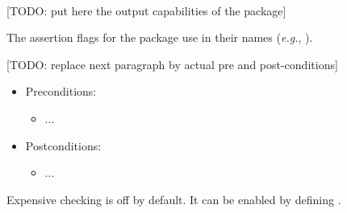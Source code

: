   \\



[TODO: put here the output capabilities of the package]



The assertion flags for the package
use  in their names (\textit{e.g.},
).

[TODO: replace next paragraph by actual pre and post-conditions]

\begin{itemize}
\item Preconditions:
    \begin{itemize}
    \item ...
    \end{itemize}
\item Postconditions:
    \begin{itemize}
    \item ...
    \end{itemize}
\end{itemize}

Expensive checking is off by default. It can be enabled by
defining .


